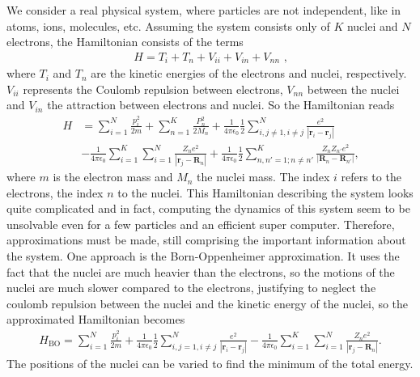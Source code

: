 \documentclass[twoside,        %
			   11pt,			%
               BCOR10mm,       %
               ngerman,english  %
               ]{scrartcl}
\begin{document}
We consider a real physical system, where particles are not independent, like in atoms, ions, molecules, etc. Assuming the system consists only of $K$ nuclei and $N$ electrons, the Hamiltonian consists of the terms
\begin{align*}
    H = T_i + T_n+ V_{ii} + V_{in} + V_{nn} \text{ ,}
\end{align*} 
where $T_i $ and $T_n$ are the kinetic energies of the electrons and nuclei, respectively. $V_{ii}$ represents the Coulomb repulsion between electrons, $V_{nn}$ between the nuclei and $V_{in}$  the attraction between electrons and nuclei. So the Hamiltonian reads
\begin{align*}
    H &= \sum_{i=1}^N \frac{p_i^2}{2m} + \sum_{n=1}^K \frac{P_n^2}{2M_n} + \frac{1}{4\pi \epsilon_0}\frac{1}{2}\sum_{i,j\neq 1, i \neq j}^N \frac{e^2}{|\mathbf{r}_i - \mathbf{r}_j|} \\ &-  \frac{1}{4\pi \epsilon_0}\sum_{i=1}^K \sum_{i=1}^N \frac{Z_n e^2}{|\mathbf{r}_j-\mathbf{R}_n|} +  \frac{1}{4\pi \epsilon_0}\frac{1}{2} \sum_{n,n'=1;n\neq n'}^K \frac{Z_n Z_{n'} e^2}{|\mathbf{R}_n - \mathbf{R}_{n'}|} \text{,}
\end{align*} where $m$ is the electron mass and $M_n$ the nuclei mass. The index $i$ refers to the electrons, the index $n$ to the nuclei.
This Hamiltonian describing the system looks quite complicated and in fact, computing the dynamics of this system seem to be unsolvable even for a few particles and an efficient super computer. Therefore, approximations must be made, still comprising the important information about the system. One approach is the Born-Oppenheimer approximation. It uses the fact that the nuclei are much heavier than the electrons, so the motions of the nuclei are much slower compared to the electrons, justifying to neglect the coulomb repulsion between the nuclei and the kinetic energy of the nuclei, so the approximated Hamiltonian becomes
\begin{align}\label{eq:H_BO}
H_\text{BO} = \sum_{i=1}^N \frac{p_i^2}{2m}  + \frac{1}{4\pi \epsilon_0}\frac{1}{2}\sum_{i,j = 1, i \neq j}^N \frac{e^2}{|\mathbf{r}_i - \mathbf{r}_j|} -  \frac{1}{4\pi \epsilon_0}\sum_{i=1}^K \sum_{i=1}^N \frac{Z_n e^2}{|\mathbf{r}_j-\mathbf{R}_n|}  \text{.}
\end{align}  
The positions of the nuclei can be varied to find the minimum of the total energy.
\end{document}
